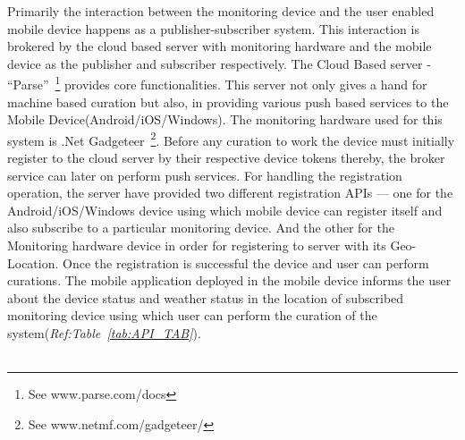 \documentclass[10pt]{article}
\begin{document}
Primarily the interaction between the monitoring device and the user enabled mobile device happens as a publisher-subscriber system. 
This interaction is brokered by the cloud based server with monitoring hardware and the mobile device as the publisher and subscriber respectively. 
The Cloud Based server - ``Parse''~\footnote{See www.parse.com/docs} provides core functionalities. 
This server not only gives a hand for machine based curation but also, in providing various push based services to the Mobile Device(Android/iOS/Windows).
The monitoring hardware used for this system is .Net Gadgeteer~\footnote{See www.netmf.com/gadgeteer/}. 
Before any curation to work the device must initially register to the cloud server by their respective device tokens thereby, the broker service can later on perform push services. 
For handling the registration operation, the server have provided two different registration APIs --- one for the Android/iOS/Windows device using which mobile device can register itself and also subscribe to a particular monitoring device.
And the other for the Monitoring hardware device in order for registering to server with its Geo-Location. 
Once the registration is successful the device and user can perform curations.
The mobile application deployed in the mobile device informs the user about the device status and weather status in the location of subscribed monitoring device using which user can perform the curation of the system(\emph{Ref:Table~\ref{tab:API_TAB}}).\\ \\
\end{document}
